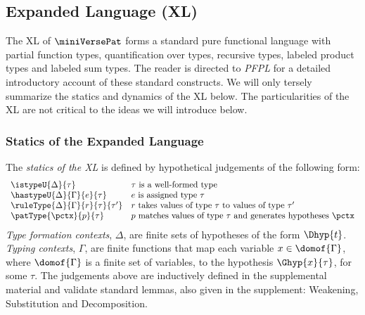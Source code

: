 \documentclass[acmsmall,10pt,review,anonymous]{acmart}\settopmatter{printfolios=true}
\begin{document}
\subsection{Expanded Language (XL)}
The {XL} of $\miniVersePat$ forms a standard pure functional language with partial function types, quantification over types, recursive types, labeled product types and labeled sum types. 
 The reader is directed to \emph{PFPL} \cite{pfple1} for a detailed introductory account of these standard constructs. We will only tersely summarize the statics and dynamics of the XL below. The particularities of the XL are not critical to the ideas we will introduce below.

\subsubsection{Statics of the Expanded Language}
The \emph{statics of the XL} is defined by hypothetical judgements of the following form:
\[\begin{array}{ll}
\istypeU{\Delta}{\tau} & \text{$\tau$ is a well-formed type}\\
\hastypeU{\Delta}{\Gamma}{e}{\tau} & \text{$e$ is assigned type $\tau$}\\
\ruleType{\Delta}{\Gamma}{r}{\tau}{\tau'} & \text{$r$ takes values of type $\tau$ to values of type $\tau'$}\\
\patType{\pctx}{p}{\tau} & \text{$p$ matches values of type $\tau$ and generates hypotheses $\pctx$} 
\end{array}\]
\emph{Type formation contexts}, $\Delta$, are finite sets of hypotheses of the form $\Dhyp{t}$. %
\emph{Typing contexts}, $\Gamma$, are finite functions that map each variable $x \in \domof{\Gamma}$, where $\domof{\Gamma}$ is a finite set of variables, to the hypothesis $\Ghyp{x}{\tau}$, for some $\tau$. The judgements above are inductively defined in the supplemental material and validate standard lemmas, also given in the supplement: Weakening, Substitution and Decomposition.
\end{document}
